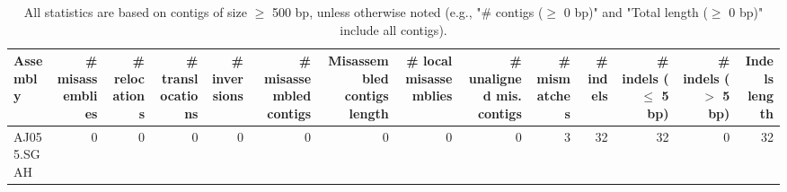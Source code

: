 \documentclass[12pt,a4paper]{article}
\begin{document}
\begin{table}[ht]
\begin{center}
\caption{All statistics are based on contigs of size $\geq$ 500 bp, unless otherwise noted (e.g., "\# contigs ($\geq$ 0 bp)" and "Total length ($\geq$ 0 bp)" include all contigs).}
\begin{tabular}{|l*{13}{|r}|}
\hline
Assembly & \# misassemblies &     \# relocations &     \# translocations &     \# inversions & \# misassembled contigs & Misassembled contigs length & \# local misassemblies & \# unaligned mis. contigs & \# mismatches & \# indels &     \# indels ($\leq$ 5 bp) &     \# indels ($>$ 5 bp) & Indels length \\ \hline
AJ055.SGAH & 0 & 0 & 0 & 0 & 0 & 0 & 0 & 0 & 3 & 32 & 32 & 0 & 32 \\ \hline
\end{tabular}
\end{center}
\end{table}
\end{document}
